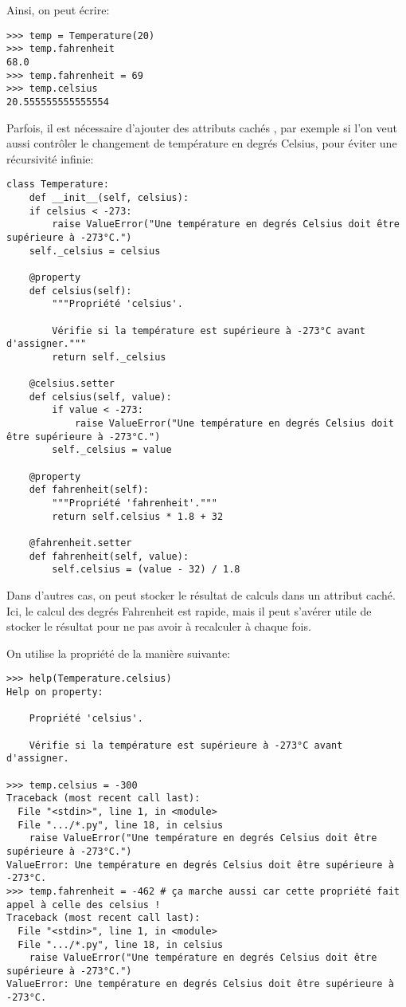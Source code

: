 Ainsi, on peut écrire:
\begin{verbatim}
>>> temp = Temperature(20)
>>> temp.fahrenheit
68.0
>>> temp.fahrenheit = 69
>>> temp.celsius
20.555555555555554
\end{verbatim}

Parfois, il est nécessaire d'ajouter des attributs \og cachés \fg{}, par exemple si l'on veut aussi contrôler le changement de 
température en degrés Celsius, pour éviter une récursivité infinie:

\begin{verbatim}
class Temperature:
    def __init__(self, celsius):
    if celsius < -273:
        raise ValueError("Une température en degrés Celsius doit être supérieure à -273°C.")
    self._celsius = celsius
    
    @property
    def celsius(self):
        """Propriété 'celsius'.
        
        Vérifie si la température est supérieure à -273°C avant d'assigner."""
        return self._celsius

    @celsius.setter
    def celsius(self, value):
        if value < -273:
            raise ValueError("Une température en degrés Celsius doit être supérieure à -273°C.")
        self._celsius = value
            
    @property
    def fahrenheit(self):
        """Propriété 'fahrenheit'."""
        return self.celsius * 1.8 + 32

    @fahrenheit.setter
    def fahrenheit(self, value):
        self.celsius = (value - 32) / 1.8
\end{verbatim}

Dans d'autres cas, on peut stocker le résultat de calculs dans un attribut caché. Ici, le calcul des degrés Fahrenheit est
rapide, mais il peut s'avérer utile de stocker le résultat pour ne pas avoir à recalculer à chaque fois.\bigskip

On utilise la propriété de la manière suivante:
\begin{verbatim}
>>> help(Temperature.celsius)
Help on property:

    Propriété 'celsius'.
    
    Vérifie si la température est supérieure à -273°C avant d'assigner.
    
>>> temp.celsius = -300
Traceback (most recent call last):
  File "<stdin>", line 1, in <module>
  File ".../*.py", line 18, in celsius
    raise ValueError("Une température en degrés Celsius doit être supérieure à -273°C.")
ValueError: Une température en degrés Celsius doit être supérieure à -273°C.
>>> temp.fahrenheit = -462 # ça marche aussi car cette propriété fait appel à celle des celsius !
Traceback (most recent call last):
  File "<stdin>", line 1, in <module>
  File ".../*.py", line 18, in celsius
    raise ValueError("Une température en degrés Celsius doit être supérieure à -273°C.")
ValueError: Une température en degrés Celsius doit être supérieure à -273°C.
\end{verbatim}

